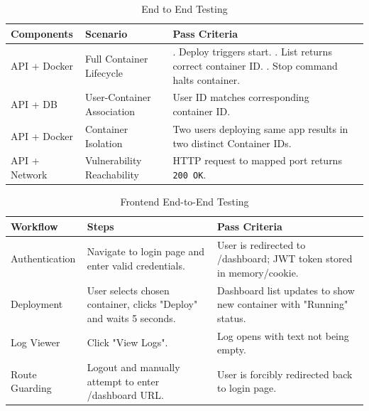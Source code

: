 \documentclass[12pt,titlepage]{article}
\begin{document}
\begin{table}[h!]
\centering
\begin{tabular}{|l|l|>{\raggedright\arraybackslash}p{4cm}|>{\raggedright\arraybackslash}p{6cm}|}
\hline
\textbf{Components} & \textbf{Scenario} & \textbf{Pass Criteria} \\ \hline
 API + Docker & Full Container Lifecycle & 1. Deploy triggers start. \newline 2. List returns correct container ID. \newline 3. Stop command halts container. 
 \\ \hline
 API + DB & User-Container Association & User ID matches corresponding container ID. 
 \\ \hline
API + Docker & Container Isolation & Two users deploying same app results in two distinct Container IDs. 
\\ \hline
 API + Network & Vulnerability Reachability & HTTP request to mapped port returns \texttt{200 OK}. 
 \\ \hline
\end{tabular}
\caption{End to End Testing}
\label{table:integration-tests}
\end{table}

\begin{table}[h!]
\centering
\begin{tabular}{|l|p{5cm}|>{\raggedright\arraybackslash}p{6cm}|}
\hline
\textbf{Workflow} & \textbf{Steps} & \textbf{Pass Criteria} \\ \hline
Authentication & Navigate to login page and enter valid credentials. & User is redirected to /dashboard; JWT token stored in memory/cookie. \\ \hline
Deployment & User selects chosen container, clicks "Deploy" and waits 5 seconds. & Dashboard list updates to show new container with "Running" status. \\ \hline
Log Viewer & Click "View Logs". & Log opens with text not being empty. \\ \hline
Route Guarding & Logout and manually attempt to enter /dashboard URL. & User is forcibly redirected back to login page. \\ \hline
\end{tabular}
\caption{Frontend End-to-End Testing}
\label{table:frontend-e2e-tests}
\end{table}
\end{document}
